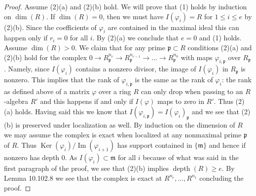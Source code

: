 \documentclass[UTF8,11pt]{ctexart}
\begin{document}
\begin{proof}
Assume (2)(a) and (2)(b) hold. We will prove that (1) holds by induction on $\dim(R)$. If $\dim(R)=0$, then we must have $I(\varphi_i)=R$ for $1\leq i\leq e$ by (2)(b). Since the coefficients of $\varphi_i$ are contained in the maximal ideal this can happen only if $r_i=0$ for all $i$. By (2)(a) we conclude that $e=0$ and (1) holds. Assume $\dim(R)>0$. We claim that for any prime $\mathfrak p\subset R$ conditions (2)(a) and (2)(b) hold for the complex $0\to R_{\mathfrak p}^{n_e}\to R_{\mathfrak p}^{n_{e-1}}\to\ldots\to R_{\mathfrak p}^{n_0}$ with maps $\varphi_{i,\mathfrak p}$ over $R_{\mathfrak p}$. Namely, since $I(\varphi_i)$ contains a nonzero divisor, the image of $I(\varphi_i)$ in $R_{\mathfrak p}$ is nonzero. This implies that the rank of $\varphi_{i,\mathfrak p}$ is the same as the rank of $\varphi_i$: the rank as defined above of a matrix $\varphi$ over a ring $R$ can only drop when passing to an $R$-algebra $R'$ and this happens if and only if $I(\varphi)$ maps to zero in $R'$. Thus (2)(a) holds. Having said this we know that $I(\varphi_{i,\mathfrak p})=I(\varphi_i)_{\mathfrak p}$ and we see that (2)(b) is preserved under localization as well. By induction on the dimension of $R$ we may assume the complex is exact when localized at any nonmaximal prime $\mathfrak p$ of $R$. Thus $\operatorname{Ker}(\varphi_i)/\operatorname{Im}(\varphi_{i+1})$ has support contained in $\{\mathfrak m\}$ and hence if nonzero has depth $0$. As $I(\varphi_i)\subset\mathfrak m$ for all $i$ because of what was said in the first paragraph of the proof, we see that (2)(b) implies $\operatorname{depth}(R)\geq e$. By Lemma 10.102.8 we see that the complex is exact at $R^{n_e},\ldots,R^{n_1}$ concluding the proof.
\end{proof}
\end{document}
